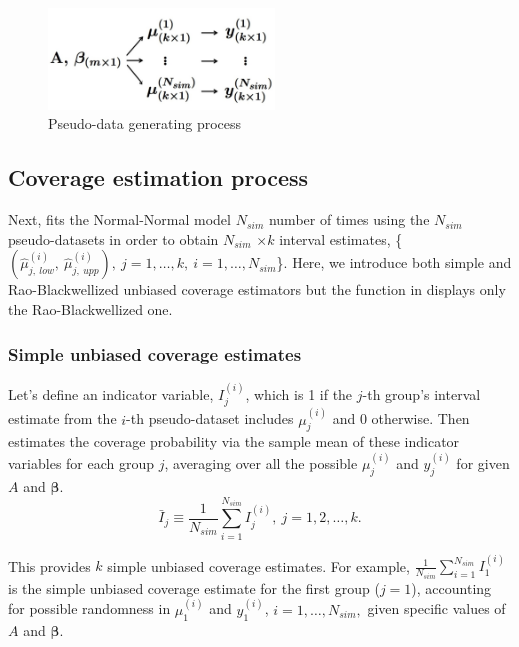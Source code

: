 \documentclass[article]{jss}
\begin{document}
\begin{figure}[h]
\begin{center}
\includegraphics[width=6cm]{process.png}
\caption{Pseudo-data generating process}
\label{fig:pseudo}
\end{center}
\end{figure}

\subsection{Coverage estimation process}
Next,  fits the Normal-Normal model  $N_{sim}$ number of times using the $N_{sim}$ pseudo-datasets in order to obtain $N_{sim}$ $\times k$ interval estimates,  \{$(\hat{\mu}^{(i)}_{j, ~low}, ~\hat{\mu}^{(i)}_{j, ~upp}), ~j=1,\ldots, k,~ i=1, \ldots, N_{sim}$\}.  Here, we introduce both simple and Rao-Blackwellized unbiased coverage estimators but the function  in  displays only the Rao-Blackwellized one.

\subsubsection{Simple unbiased coverage estimates}
Let's define an indicator variable, $I^{(i)}_{j}$, which is 1 if the $j$-th group's interval estimate from the $i$-th pseudo-dataset includes $\mu^{(i)}_{j}$ and 0 otherwise. Then  estimates the coverage probability via the sample mean of these indicator variables for each group $j$, averaging over all the possible $\mu^{(i)}_{j}$ and $y^{(i)}_{j}$ for given $A$ and $\boldsymbol{\beta}$. 
\begin{equation}
\bar{I}_{j}\equiv \frac{1}{N_{sim}}\sum_{i=1}^{N_{sim}}I^{(i)}_{j},~ j=1, 2, \ldots, k.
\end{equation}

This provides $k$ simple unbiased coverage estimates. For example, $\frac{1}{N_{sim}}\sum_{i=1}^{N_{sim}}I^{(i)}_{1}$ is the simple unbiased coverage estimate for the first group ($j=1$), accounting for possible randomness in $\mu^{(i)}_{1}$ and $y^{(i)}_{1}$, $i=1, \ldots, N_{sim},$ given specific values of $A$ and $\boldsymbol{\beta}$. 
\end{document}
